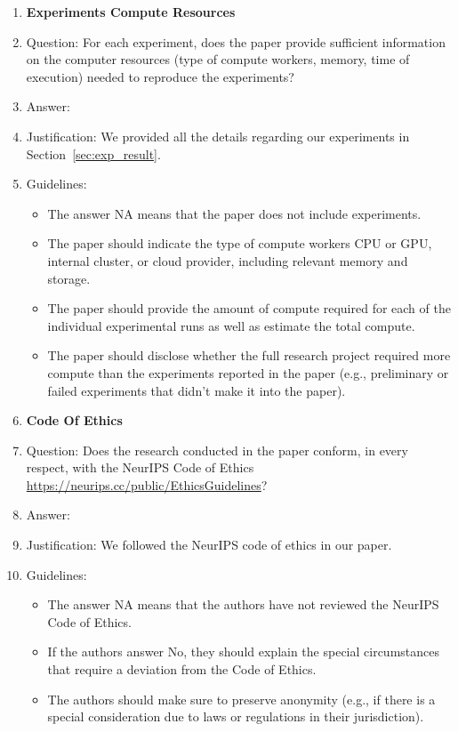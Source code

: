 \documentclass{article}
\begin{document}
\begin{enumerate}
\item {\bf Experiments Compute Resources}
    \item[] Question: For each experiment, does the paper provide sufficient information on the computer resources (type of compute workers, memory, time of execution) needed to reproduce the experiments?
    \item[] Answer: \answerYes{} %
    \item[] Justification: We provided all the details regarding our experiments in Section~\ref{sec:exp_result}. 
    \item[] Guidelines:
    \begin{itemize}
        \item The answer NA means that the paper does not include experiments.
        \item The paper should indicate the type of compute workers CPU or GPU, internal cluster, or cloud provider, including relevant memory and storage.
        \item The paper should provide the amount of compute required for each of the individual experimental runs as well as estimate the total compute. 
        \item The paper should disclose whether the full research project required more compute than the experiments reported in the paper (e.g., preliminary or failed experiments that didn't make it into the paper). 
    \end{itemize}
    
\item {\bf Code Of Ethics}
    \item[] Question: Does the research conducted in the paper conform, in every respect, with the NeurIPS Code of Ethics \url{https://neurips.cc/public/EthicsGuidelines}?
    \item[] Answer: \answerYes{} %
    \item[] Justification: We followed the NeurIPS code of ethics in our paper. 
    \item[] Guidelines:
    \begin{itemize}
        \item The answer NA means that the authors have not reviewed the NeurIPS Code of Ethics.
        \item If the authors answer No, they should explain the special circumstances that require a deviation from the Code of Ethics.
        \item The authors should make sure to preserve anonymity (e.g., if there is a special consideration due to laws or regulations in their jurisdiction).
    \end{itemize}



\end{enumerate}
\end{document}
